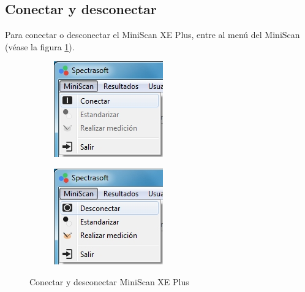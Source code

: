 	\subsection*{Conectar y desconectar}
		Para conectar o desconectar el MiniScan XE Plus, entre al men\'{u} del MiniScan (v\'{e}ase la figura \ref{fig:conectar-desconectar}).
\vfill
\begin{figure}[H]
\centering
\begin{subfigure}{.5\textwidth}
  \centering
  \includegraphics[width=.6\linewidth]{./img/conectar.jpg}
\end{subfigure}%
\begin{subfigure}{.5\textwidth}
  \centering
  \includegraphics[width=.6\linewidth]{./img/desconectar.jpg}
\end{subfigure}
\caption[]{Conectar y desconectar MiniScan XE Plus\label{fig:conectar-desconectar}}
\end{figure}
\vfill
